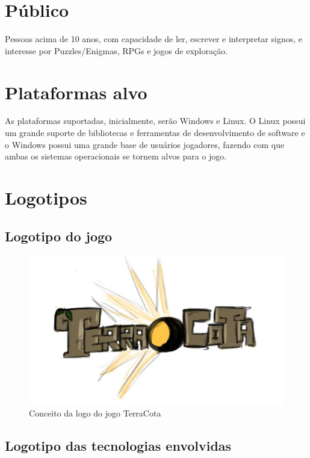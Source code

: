 \documentclass[11pt]{article}
\begin{document}
\section{Público}
Pessoas acima de 10 anos, com capacidade de ler, escrever e interpretar signos, e interesse por Puzzles/Enigmas, RPGs e jogos de exploração.

\section{Plataformas alvo}
As plataformas suportadas, inicialmente, serão Windows e Linux.
O Linux possui um grande suporte de bibliotecas e ferramentas de desenvolvimento de software e o Windows possui uma grande base de usuários jogadores, fazendo com que ambas os sistemas operacionais se tornem alvos para o jogo.


\section{Logotipos}
\subsection{Logotipo do jogo}
\begin{figure}[!htp]
\centering
\includegraphics[scale=0.5]{logo-terracota.jpg}
\caption{Conceito da logo do jogo TerraCota}
\label{TerraCota logo}
\end{figure}

\subsection{Logotipo das tecnologias envolvidas}
\end{document}
